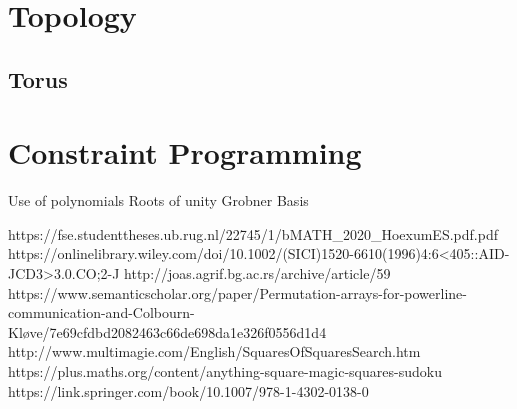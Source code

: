 \documentclass[a4paper,12pt]{article}
\begin{document}
\section{Topology}
	\subsection{Torus}
\section{Constraint Programming}
	Use of polynomials
	Roots of unity
	Grobner Basis

\begin{thebibliography}{100}
	 https://fse.studenttheses.ub.rug.nl/22745/1/bMATH_2020_HoexumES.pdf.pdf
	 https://onlinelibrary.wiley.com/doi/10.1002/(SICI)1520-6610(1996)4:6<405::AID-JCD3>3.0.CO;2-J
	 http://joas.agrif.bg.ac.rs/archive/article/59
	 https://www.semanticscholar.org/paper/Permutation-arrays-for-powerline-communication-and-Colbourn-Kløve/7e69cfdbd2082463c66de698da1e326f0556d1d4
	 http://www.multimagie.com/English/SquaresOfSquaresSearch.htm
	 https://plus.maths.org/content/anything-square-magic-squares-sudoku
	 https://link.springer.com/book/10.1007/978-1-4302-0138-0
\end{thebibliography}
\end{document}
